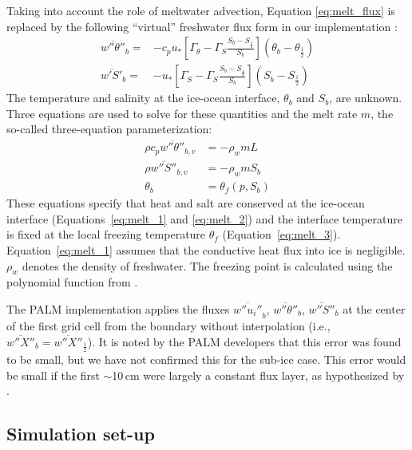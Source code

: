 \documentclass[tc, manuscript]{copernicus}
\begin{document}
Taking into account the role of meltwater advection, Equation \ref{eq:melt_flux} is replaced by the following ``virtual'' freshwater flux form in our implementation \citep{asay-davis_experimental_2016, jenkins_role_2001}:
\begin{align}
    \overline{w''\theta''}_{b} =& -c_p u_*
    \left[\Gamma_{\theta} - \Gamma_S \frac{S_b - S_{\frac{1}{2}}}{S_b}\right]\left(\theta_b-\theta_{\frac{1}{2}}\right) \label{eq:vflux_heat}\\
    \overline{w'S'}_{b} =& -u_*
    \left[\Gamma_S - \Gamma_S \frac{S_b - S_{\frac{1}{2}}}{S_b}\right]\left(S_b-S_{\frac{1}{2}}\right) \label{eq:vflux_salt}
\end{align}
%
The temperature and salinity at the ice-ocean interface, $\theta_b$ and $S_b$, are unknown. Three equations are used to solve for these quantities and the melt rate $m$, the so-called three-equation parameterization:
%
\begin{align}
    \rho c_p \overline{w''\theta''}_{b,v} &= -\rho_w m L \label{eq:melt_1}\\
    \rho \overline{w''S''}_{b,v} &= −\rho_w m S_b \label{eq:melt_2}\\
    \theta_b &= \theta_f(p,S_b) \label{eq:melt_3}
\end{align}
%
These equations specify that heat and salt are conserved at the ice-ocean interface (Equations~\ref{eq:melt_1} and \ref{eq:melt_2}) and the interface temperature is fixed at the local freezing temperature $\theta_f$ (Equation~\ref{eq:melt_3}). Equation~\ref{eq:melt_1} assumes that the conductive heat flux into ice is negligible. $\rho_w$ denotes the density of freshwater. The freezing point is calculated using the polynomial function from \citet{jackett_algorithms_2006}.

The PALM implementation applies the fluxes $\overline{w''u_i''}_b$, $\overline{w''\theta''}_b$, $\overline{w''S''}_b$ at the center of the first grid cell from the boundary without interpolation (i.e., $\overline{w''X''}_b = \overline{w''X''}_{\frac{1}{2}}$). It is noted by the PALM developers that this error was found to be small, but we have not confirmed this for the sub-ice case. This error would be small if the first $\sim$10\,\unit{cm} were largely a constant flux layer, as hypothesized by \citet{mcphee_turbulent_1983}. 


\subsection{Simulation set-up}\label{meth:setup}
\end{document}
